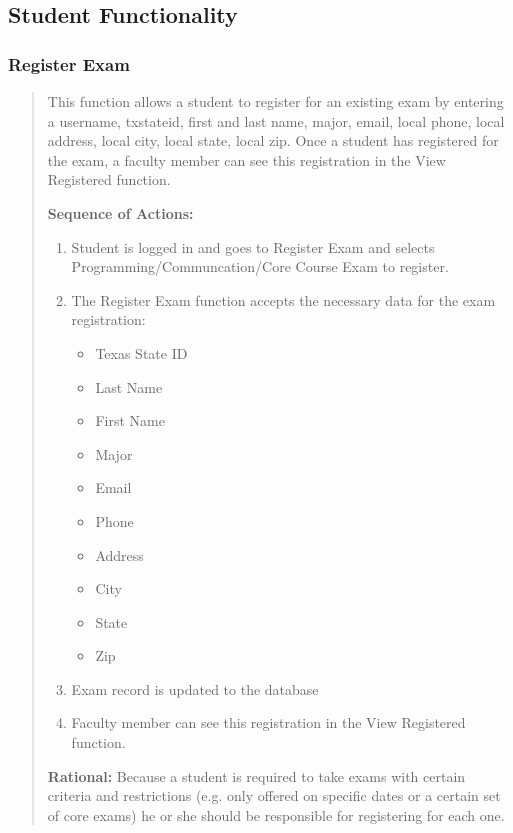 \subsection*{Student Functionality}

\subsubsection{Register Exam} 
\begin{quote} %
         This function allows a student to register for an existing exam by
         entering a username, txstateid, first and last name, major, email,
         local phone, local address, local city, local state, local zip.
         Once a student has registered for the exam, a faculty member can see
         this registration in the View Registered function.
         
         \textbf{Sequence of Actions:}
         \begin{enumerate}
            \item Student is logged in and goes to Register Exam and selects
               Programming/Communcation/Core Course Exam to register.
            \item The Register Exam function accepts the necessary data for the exam
               registration:
               \begin{itemize}
                  \item Texas State ID
                  \item Last Name
                  \item First Name
                  \item Major
                  \item Email
                  \item Phone
                  \item Address
                  \item City
                  \item State
                  \item Zip
               \end{itemize}
            \item Exam record is updated to the database
            \item Faculty member can see this registration in the View Registered
               function.
         \end{enumerate}

         \textbf{Rational:}
         Because a student is required to take exams with certain criteria and
         restrictions (e.g. only offered on specific dates or a certain set of
         core exams) he or she should be responsible for registering for each one.
   \end{quote} %

